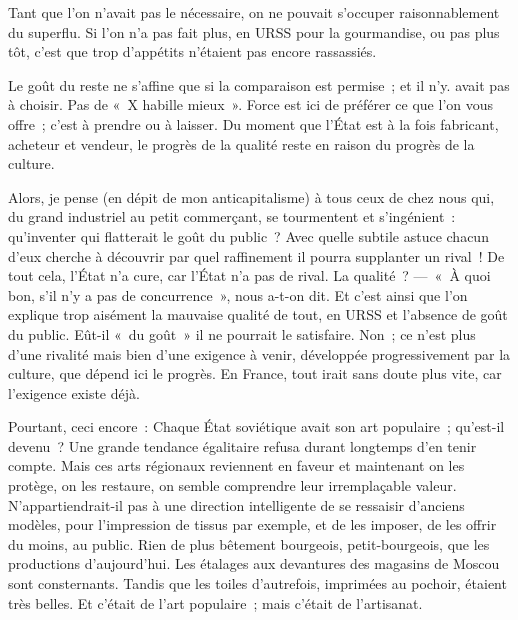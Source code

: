 \documentclass[twoside]{book} %
\newcommand{\astermono}{\medskip\centerline{\color{rubric}\large\selectfont{\syms ✻}}\medskip\par}%
\begin{document}
\noindent Tant que l’on n’avait pas le nécessaire, on ne pouvait s’occuper raisonnablement du superflu. Si l’on n’a pas fait plus, en URSS pour la gourmandise, ou pas plus tôt, c’est que trop d’appétits n’étaient pas encore rassassiés.\par
Le goût du reste ne s’affine que si la comparaison est permise ; et il n’y. avait pas à choisir. Pas de « X habille mieux ». Force est ici de préférer ce que l’on vous offre ; c’est à prendre ou à laisser. Du moment que l’État est à la fois fabricant, acheteur et vendeur, le progrès de la qualité reste en raison du progrès de la culture.\par
Alors, je pense (en dépit de mon anticapitalisme) à tous ceux de chez nous qui, du grand industriel au petit commerçant, se tourmentent et s’ingénient : qu’inventer qui flatterait le goût du public ? Avec quelle subtile astuce chacun d’eux cherche à découvrir par quel raffinement il pourra supplanter un rival ! De tout cela, l’État n’a cure, car l’État n’a pas de rival. La qualité ? — « À quoi bon, s’il n’y a pas de concurrence », nous a-t-on dit. Et c’est ainsi que l’on explique trop aisément la mauvaise qualité de tout, en URSS et l’absence de goût du public. Eût-il « du goût » il ne pourrait le satisfaire. Non ; ce n’est plus d’une rivalité mais bien d’une exigence à venir, développée progressivement par la culture, que dépend ici le progrès. En France, tout irait sans doute plus vite, car l’exigence existe déjà.\par
Pourtant, ceci encore : Chaque État soviétique avait son art populaire ; qu’est-il devenu ? Une grande tendance égalitaire refusa durant longtemps d’en tenir compte. Mais ces arts régionaux reviennent en faveur et maintenant on les protège, on les restaure, on semble comprendre leur irremplaçable valeur. N’appartiendrait-il pas à une direction intelligente de se ressaisir d’anciens modèles, pour l’impression de tissus par exemple, et de les imposer, de les offrir du moins, au public. Rien de plus bêtement bourgeois, petit-bourgeois, que les productions d’aujourd’hui. Les étalages aux devantures des magasins de Moscou sont consternants. Tandis que les toiles d’autrefois, imprimées au pochoir, étaient très belles. Et c’était de l’art populaire ; mais c’était de l’artisanat.\par

\astermono
\end{document}
